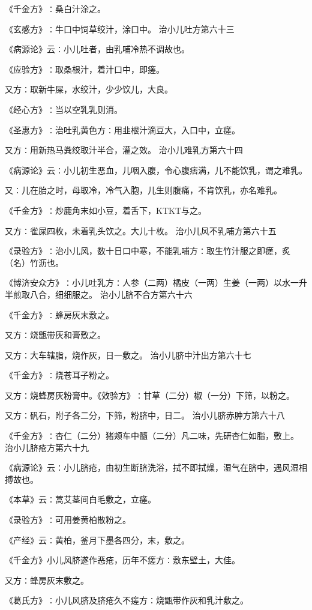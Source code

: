 \documentclass[a4paper,12pt,UTF8,twoside]{ctexbook}
\begin{document}
《千金方》∶桑白汁涂之。

《玄感方》∶牛口中饲草绞汁，涂口中。
治小儿吐方第六十三

《病源论》云∶小儿吐者，由乳哺冷热不调故也。

《应验方》∶取桑根汁，着汁口中，即瘥。

又方∶取新牛屎，水绞汁，少少饮儿，大良。

《经心方》∶当以空乳乳则消。

《圣惠方》∶治吐乳黄色方∶用韭根汁滴豆大，入口中，立瘥。

又方∶用新热马粪绞取汁半合，灌之效。
治小儿难乳方第六十四

《病源论》云∶小儿初生恶血，儿咽入腹，令心腹痞满，儿不能饮乳，谓之难乳。

又∶儿在胎之时，母取冷，冷气入胞，儿生则腹痛，不肯饮乳，亦名难乳。

《千金方》∶炒鹿角末如小豆，着舌下，KTKT与之。

又方∶雀屎四枚，未着乳头饮之。大儿十枚。
治小儿风不乳哺方第六十五

《录验方》∶治小儿风，数十日口中寒，不能乳哺方∶取生竹汁服之即瘥，炙（名）竹沥也。

《博济安众方》∶小儿吐乳方∶人参（二两）橘皮（一两）生姜（一两）以水一升半煎取八合，细细服之。
治小儿脐不合方第六十六

《千金方》∶蜂房灰末敷之。

又方∶烧甑带灰和膏敷之。

又方∶大车辖脂，烧作灰，日一敷之。
治小儿脐中汁出方第六十七

《千金方》∶烧苍耳子粉之。

又方∶烧蜂房灰粉膏中。《效验方》∶甘草（二分）椒（一分）下筛，以粉之。

又方∶矾石，附子各二分，下筛，粉脐中，日二。
治小儿脐赤肿方第六十八

《千金方》∶杏仁（二分）猪颊车中髓（二分）凡二味，先研杏仁如脂，敷上。
治小儿脐疮方第六十九

《病源论》云∶小儿脐疮，由初生断脐洗浴，拭不即拭燥，湿气在脐中，遇风湿相搏故也。

《本草》云∶蒿艾茎间白毛敷之，立瘥。

《录验方》∶可用姜黄柏散粉之。

《产经》云∶黄柏，釜月下墨各四分，末，敷之。

《千金方》小儿风脐遂作恶疮，历年不瘥方∶敷东壁土，大佳。

又方∶蜂房灰末敷之。

《葛氏方》∶小儿风脐及脐疮久不瘥方∶烧甑带作灰和乳汁敷之。
\end{document}
